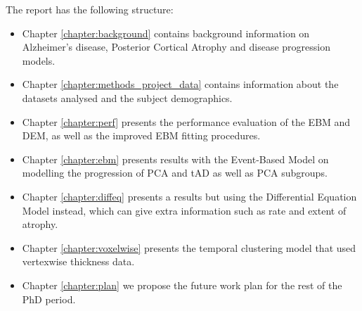 The report has the following structure:
\begin{itemize}
 \item Chapter \ref{chapter:background} contains background information on Alzheimer's disease, Posterior Cortical Atrophy and disease progression models. 
 \item Chapter \ref{chapter:methods_project_data} contains information about the datasets analysed and the subject demographics. 
 \item Chapter \ref{chapter:perf} presents the performance evaluation of the EBM and DEM, as well as the improved EBM fitting procedures.
 \item Chapter \ref{chapter:ebm} presents results with the Event-Based Model on modelling the progression of PCA and tAD as well as PCA subgroups.
 \item Chapter \ref{chapter:diffeq} presents a results but using the Differential Equation Model instead, which can give extra information such as rate and extent of atrophy.
 \item Chapter \ref{chapter:voxelwise} presents the  temporal clustering model that used vertexwise thickness data.
 \item Chapter \ref{chapter:plan} we propose the future work plan for the rest of the PhD period.
 \end{itemize}



